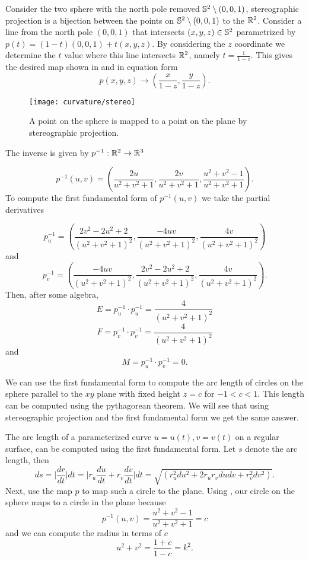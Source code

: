 \begin{example}\label{ex:stereo}
Consider the two sphere with the north pole removed $\mathbb{S}^2 \setminus (0,0,1)$,
stereographic projection is a bijection between the points on $\mathbb{S}^2 \setminus (0,0,1)$ to the $\mathbb{R}^2$.
Consider a line from the north pole $(0,0,1)$ that intersects $(x,y,z)\in \mathbb{S}^2$ parametrized by 
$p(t)=(1-t)(0,0,1)+t(x,y,z)$. By considering the $z$ coordinate we determine the $t$ value where this line
intersects $\mathbb{R}^2$, namely $t=\frac{1}{1-z}.$
This gives the desired map shown in  and in equation form
$$p(x,y,z)\to \left(\frac{x}{1-z},\frac{y}{1-z}\right).$$

\begin{figure}[htb]
	\centering
	\texttt{[image: curvature/stereo]}
	\caption{A point on the sphere is mapped to a point on the plane by stereographic projection.}
	\label{fig:stereo}
\end{figure}
	
The inverse is given by $p^{-1}:\mathbb{R}^2\to \mathbb{R}^3$

	\begin{equation}\label{eqn:stereo}
		p^{-1}(u,v)=\left(\frac{2u}{u^2+v^2+1},\frac{2v}{u^2+v^2+1},\frac{u^2+v^2-1}{u^2+v^2+1}\right).	
	\end{equation}
To compute the first fundamental form of $p^{-1}(u,v)$ we take the partial derivatives

$$p^{-1}_u=\left(\frac{2v^2-2u^2+2}{(u^2+v^2+1)^2},\frac{-4uv}{(u^2+v^2+1)^2},\frac{4v}{(u^2+v^2+1)^2}\right)$$
and 
$$p^{-1}_v=\left(\frac{-4uv}{(u^2+v^2+1)^2},\frac{2v^2-2u^2+2}{(u^2+v^2+1)^2},\frac{4v}{(u^2+v^2+1)^2}\right).$$
Then, after some algebra,
$$E=p^{-1}_u\cdot p^{-1}_u=\frac{4}{(u^2+v^2+1)^2}$$
$$F=p^{-1}_v\cdot p^{-1}_v=\frac{4}{(u^2+v^2+1)^2}$$
and
$$M=p^{-1}_u\cdot p^{-1}_v=0.$$

We can use the first fundamental form to compute
the arc length of circles on the sphere parallel to the $xy$ plane with fixed height $z=c$ for $-1<c<1$.
This length can be computed using
the pythagorean theorem. We will see that using stereographic projection
and the first fundamental form we get the same answer.


The arc length of a parameterized curve $u=u(t), v=v(t)$ on a regular surface,
can be computed using the first fundamental form.  Let
$s$ denote the arc length, then 
$$ds=\bigg | \frac{dr}{dt}\bigg | dt = \bigg | r_u\frac{du}{dt}+r_v\frac{dv}{dt}\bigg |dt
=\sqrt{(r_u^2 du^2+2r_ur_v du dv + r_v^2dv^2)}.$$
Next, use the map $p$ to map such a circle to the plane.
Using , our circle on the sphere maps 
to a circle in the plane because
	$$p^{-1}(u,v)=\frac{u^2+v^2-1}{u^2+v^2+1}=c$$
and we can compute the radius in terms of $c$
\begin{equation}\label{eqn:radius}
	u^2+v^2=\frac{1+c}{1-c}=k^2.
\end{equation}
	

\end{example}
